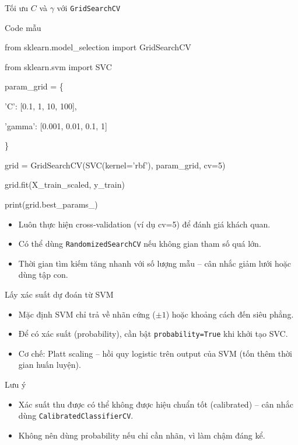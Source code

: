 \begin{frame}{Tối ưu $C$ và $\gamma$ với \texttt{GridSearchCV}}
  \begin{block}{Code mẫu}
    \begin{semiverbatim}
from sklearn.model\_selection import GridSearchCV

from sklearn.svm import SVC

param\_grid = \{

    'C': [0.1, 1, 10, 100],

    'gamma': [0.001, 0.01, 0.1, 1]

\}

grid = GridSearchCV(SVC(kernel='rbf'), param\_grid, cv=5)

grid.fit(X\_train\_scaled, y\_train)

print(grid.best\_params\_)
    \end{semiverbatim}
  \end{block}
  \begin{itemize}
    \item Luôn thực hiện cross‑validation (ví dụ cv=5) để đánh giá khách quan.
    \item Có thể dùng \texttt{RandomizedSearchCV} nếu không gian tham số quá lớn.
    \item Thời gian tìm kiếm tăng nhanh với số lượng mẫu – cân nhắc giảm lưới hoặc dùng tập con.
  \end{itemize}
\end{frame}


\begin{frame}{Lấy xác suất dự đoán từ SVM}
  \begin{itemize}
    \item Mặc định SVM chỉ trả về nhãn cứng ($\pm 1$) hoặc khoảng cách đến siêu phẳng.
    \item Để có xác suất (probability), cần bật \texttt{probability=True} khi khởi tạo SVC.
    \item Cơ chế: Platt scaling – hồi quy logistic trên output của SVM (tốn thêm thời gian huấn luyện).
  \end{itemize}
  \begin{block}{Lưu ý}
    \begin{itemize}
      \item Xác suất thu được có thể không được hiệu chuẩn tốt (calibrated) – cân nhắc dùng \texttt{CalibratedClassifierCV}.
      \item Không nên dùng probability nếu chỉ cần nhãn, vì làm chậm đáng kể.
    \end{itemize}
  \end{block}
\end{frame}

